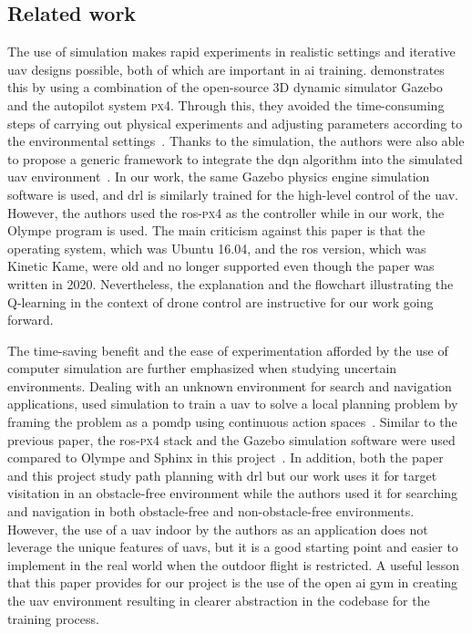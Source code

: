 \documentclass[../main.tex]{subfiles}
\begin{document}
\subsection{Related work}



The use of simulation makes rapid experiments in realistic settings 
and iterative \gls{uav} designs possible, 
both of which are important in \gls{ai} training. 
\citeauthor{Zho20} demonstrates this by %
using a combination of the open-source 3D dynamic simulator Gazebo
and the autopilot system \textsc{px4}.
Through this, they avoided the time-consuming steps of 
carrying out physical experiments
and adjusting parameters according 
to the environmental settings~\cite{Zho20}.
Thanks to the simulation, 
the authors were also able to propose a generic
framework to integrate the \gls{dqn} algorithm into 
the simulated \gls{uav} environment~\cite{Zho20}.
In our work, the same Gazebo physics engine
simulation software is used, and \gls{drl} is similarly trained
for the high-level control of the \gls{uav}. 
However, the authors used the \gls{ros}-\textsc{px4} as the controller 
while in our work, the Olympe program is used.
The main criticism against this paper is that the operating system,
which was Ubuntu 16.04, and 
the \gls{ros} version, which was Kinetic Kame, 
were old and no longer supported 
even though the paper was written in 2020.
Nevertheless, the explanation and the flowchart illustrating the 
Q-learning in the context of drone control are instructive 
for our work going forward.

The time-saving benefit and the ease of experimentation 
afforded by the use of computer simulation are further emphasized 
when studying uncertain environments.
Dealing with an unknown environment for search and navigation applications,
\citeauthor{Wal19} used simulation to train a \gls{uav}
to solve a local planning problem
by framing the problem as 
a \gls{pomdp}
using continuous action spaces~\cite{Wal19}.
Similar to the previous paper, the \gls{ros}-\textsc{px4} stack 
and the Gazebo 
simulation software were used compared to Olympe and Sphinx 
in this project~\cite{Wal19}.
In addition, both the paper and this project study path planning 
with \gls{drl} but our work uses it for target visitation 
in an obstacle-free environment 
while the authors used it for searching and navigation
in both obstacle-free and non-obstacle-free environments.
However, the use of a \gls{uav} indoor by the authors as an application 
does not leverage the unique features of \glspl{uav}, 
but it is a good starting point 
and easier to implement in the real world 
when the outdoor flight is restricted.
A useful lesson that this paper provides for our project
is the use of the open \gls{ai} gym in creating the \gls{uav} environment
resulting in clearer abstraction in the codebase
for the training process.
\end{document}
